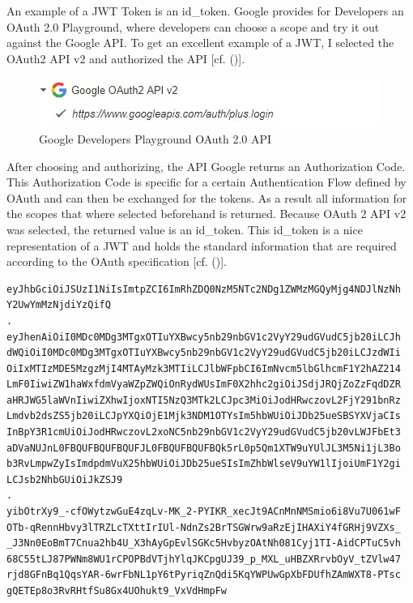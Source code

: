 An example of a JWT Token is an id\_token. Google provides for Developers an OAuth 2.0 Playground, where developers can choose a scope and try it out against the Google API. To get an excellent example of a JWT, I selected the OAuth2 API v2 and authorized the API [cf. (\cite{Google:2018:OAuthPlayground})].


\begin{figure}[h]
	\centering
	\includegraphics[width=0.8\linewidth]{images/googleOAuthPlaygroundOAuthAPI}
	\caption[OAuth API]{Google Developers Playground OAuth 2.0 API}
	\label{fig:googleoauthplaygroundoauthapi}
\end{figure}

After choosing and authorizing, the API Google returns an Authorization Code. This Authorization Code is specific for a certain Authentication Flow defined by OAuth and can then be exchanged for the tokens. As a result all information for the scopes that where selected beforehand is returned. Because OAuth 2 API v2 was selected, the returned value is an id\_token. This id\_token is a nice representation of a JWT and holds the standard information that are required according to the OAuth specification  [cf. (\cite{Google:2018:OAuthPlayground})].



\begin{lstlisting}
eyJhbGciOiJSUzI1NiIsImtpZCI6ImRhZDQ0NzM5NTc2NDg1ZWMzMGQyMjg4NDJlNzNh
Y2UwYmMzNjdiYzQifQ
.
eyJhenAiOiI0MDc0MDg3MTgxOTIuYXBwcy5nb29nbGV1c2VyY29udGVudC5jb20iLCJh
dWQiOiI0MDc0MDg3MTgxOTIuYXBwcy5nb29nbGV1c2VyY29udGVudC5jb20iLCJzdWIi
OiIxMTIzMDE5MzgzMjI4MTAyMzk3MTIiLCJlbWFpbCI6ImNvcm5lbGlhcmF1Y2hAZ214
LmF0IiwiZW1haWxfdmVyaWZpZWQiOnRydWUsImF0X2hhc2giOiJSdjJRQjZoZzFqdDZR
aHRJWG5laWVnIiwiZXhwIjoxNTI5NzQ3MTk2LCJpc3MiOiJodHRwczovL2FjY291bnRz
Lmdvb2dsZS5jb20iLCJpYXQiOjE1Mjk3NDM1OTYsIm5hbWUiOiJDb25ueSBSYXVjaCIs
InBpY3R1cmUiOiJodHRwczovL2xoNC5nb29nbGV1c2VyY29udGVudC5jb20vLWJFbEt3
aDVaNUJnL0FBQUFBQUFBQUFJL0FBQUFBQUFBQk5rL0p5Qm1XTW9uYUlJL3M5Ni1jL3Bo
b3RvLmpwZyIsImdpdmVuX25hbWUiOiJDb25ueSIsImZhbWlseV9uYW1lIjoiUmF1Y2gi
LCJsb2NhbGUiOiJkZSJ9
.
yibOtrXy9_-cfOWytzwGuE4zqLv-MK_2-PYIKR_xecJt9ACnMnNMSmio6i8Vu7U061wF
OTb-qRennHbvy3lTRZLcTXttIrIUl-NdnZs2BrTSGWrw9aRzEjIHAXiY4fGRHj9VZXs_
_J3Nn0EoBmT7Cnua2hb4U_X3hAyGpEvlSGKc5HvbyzOAtNh081Cyj1TI-AidCPTuC5vh
68C55tLJ87PWNm8WU1rCPOPBdVTjhYlqJKCpgUJ39_p_MXL_uHBZXRrvbOyV_tZVlw47
rjd8GFnBq1QqsYAR-6wrFbNL1pY6tPyriqZnQdi5KqYWPUwGpXbFDUfhZAmWXT8-PTsc
gQETEp8o3RvRHtfSu8Gx4UOhukt9_VxVdHmpFw
\end{lstlisting}


